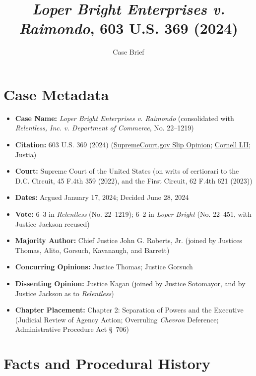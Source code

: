 \documentclass[12pt]{article}
\title{\textit{Loper Bright Enterprises v. Raimondo}, 603 U.S. 369 (2024)}
\author{Case Brief}
\date{}
\begin{document}
\maketitle

\section{Case Metadata}

\begin{itemize}
  \item \textbf{Case Name:} \textit{Loper Bright Enterprises v. Raimondo} (consolidated with \textit{Relentless, Inc. v. Department of Commerce}, No. 22--1219)
  \item \textbf{Citation:} 603 U.S. 369 (2024) (\href{https://www.supremecourt.gov/opinions/23pdf/22-451_7m58.pdf}{SupremeCourt.gov Slip Opinion}; \href{https://www.law.cornell.edu/supremecourt/text/22-451}{Cornell LII}; \href{https://supreme.justia.com/cases/federal/us/603/22-451/}{Justia})
  \item \textbf{Court:} Supreme Court of the United States (on writs of certiorari to the D.C. Circuit, 45 F.4th 359 (2022), and the First Circuit, 62 F.4th 621 (2023))
  \item \textbf{Dates:} Argued January 17, 2024; Decided June 28, 2024
  \item \textbf{Vote:} 6--3 in \textit{Relentless} (No. 22--1219); 6--2 in \textit{Loper Bright} (No. 22--451, with Justice Jackson recused)
  \item \textbf{Majority Author:} Chief Justice John G. Roberts, Jr. (joined by Justices Thomas, Alito, Gorsuch, Kavanaugh, and Barrett)
  \item \textbf{Concurring Opinions:} Justice Thomas; Justice Gorsuch
  \item \textbf{Dissenting Opinion:} Justice Kagan (joined by Justice Sotomayor, and by Justice Jackson as to \textit{Relentless})
  \item \textbf{Chapter Placement:} Chapter 2: Separation of Powers and the Executive (Judicial Review of Agency Action; Overruling \textit{Chevron} Deference; Administrative Procedure Act \S~706)
\end{itemize}

\section{Facts and Procedural History}
\end{document}
